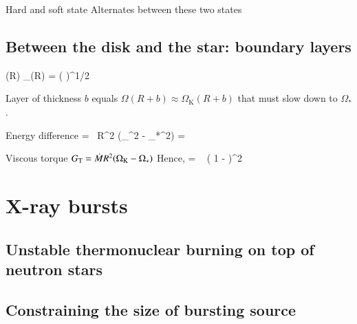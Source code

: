 Hard and soft state \cite{HvdK89}
Alternates between these two states \cite{MDF14} \cite{DGK07}



\subsection{Between the disk and the star: boundary layers}

\be
\Omega(R) \approx \Omega_{}(R) = \left(  \right)^{1/2}
\ee

Layer of thickness $b$ equals $\Omega(R + b) \approx \Omega_{\mathrm{K}}(R + b)$ that must slow down to $\Omega_{*}$.

Energy difference
\be
{} =  \Mdot R^2 (\Omega_{}^2 - \Omega_{*}^2) = 
 \Mdot {}  
\ee

Viscous torque $G_{\mathrm{T}} = \dot{M} R^2 (\Omega_{\mathrm{K}} - \Omega_*)$
Hence,
\be
{} =   \left( 1 -  \right)^2
\ee


\section{X-ray bursts}
\subsection{Unstable thermonuclear burning on top of neutron stars}

\subsection{Constraining the size of bursting source}



